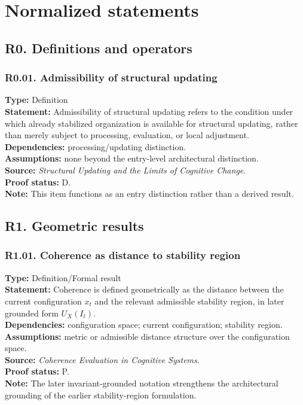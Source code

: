 \documentclass[12pt]{article}
\begin{document}
	\section{Normalized statements}
	
	\subsection{R0. Definitions and operators}
	
	\subsubsection*{R0.01. Admissibility of structural updating}
	\textbf{Type:} Definition \\
	\textbf{Statement:} Admissibility of structural updating refers to the condition under which
	already stabilized organization is available for structural updating, rather than merely
	subject to processing, evaluation, or local adjustment. \\
	\textbf{Dependencies:} processing/updating distinction. \\
	\textbf{Assumptions:} none beyond the entry-level architectural distinction. \\
	\textbf{Source:} \emph{Structural Updating and the Limits of Cognitive Change}. \\
	\textbf{Proof status:} D. \\
	\textbf{Note:} This item functions as an entry distinction rather than a derived result.
	
	\subsection{R1. Geometric results}
	
	\subsubsection*{R1.01. Coherence as distance to stability region}
	\textbf{Type:} Definition/Formal result \\
	\textbf{Statement:} Coherence is defined geometrically as the distance between the current
	configuration $x_t$ and the relevant admissible stability region, in later grounded form
	$U_X(I_t)$. \\
	\textbf{Dependencies:} configuration space; current configuration; stability region. \\
	\textbf{Assumptions:} metric or admissible distance structure over the configuration space. \\
	\textbf{Source:} \emph{Coherence Evaluation in Cognitive Systems}. \\
	\textbf{Proof status:} P. \\
	\textbf{Note:} The later invariant-grounded notation strengthens the architectural grounding
	of the earlier stability-region formulation.
	
\end{document}
